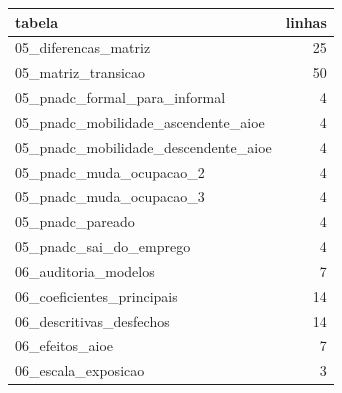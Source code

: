 \begin{tabular}{lr}
\toprule
tabela & linhas \\
\midrule
05\_diferencas\_matriz & 25 \\
05\_matriz\_transicao & 50 \\
05\_pnadc\_formal\_para\_informal & 4 \\
05\_pnadc\_mobilidade\_ascendente\_aioe & 4 \\
05\_pnadc\_mobilidade\_descendente\_aioe & 4 \\
05\_pnadc\_muda\_ocupacao\_2 & 4 \\
05\_pnadc\_muda\_ocupacao\_3 & 4 \\
05\_pnadc\_pareado & 4 \\
05\_pnadc\_sai\_do\_emprego & 4 \\
06\_auditoria\_modelos & 7 \\
06\_coeficientes\_principais & 14 \\
06\_descritivas\_desfechos & 14 \\
06\_efeitos\_aioe & 7 \\
06\_escala\_exposicao & 3 \\
\bottomrule
\end{tabular}
